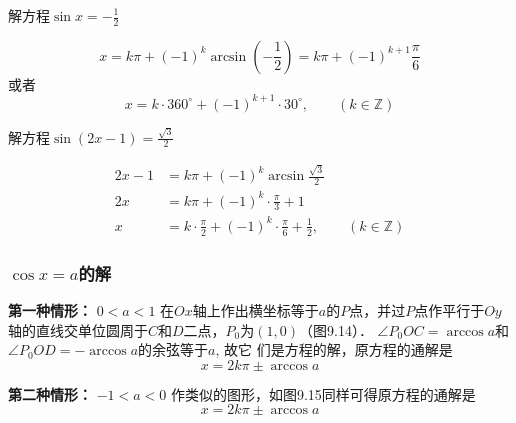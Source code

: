 \begin{example}
    解方程$\sin x=-\frac{1}{2} $
\end{example}

\begin{solution}
\[x=k\pi+(-1)^k\arcsin\left(-\frac{1}{2}\right)=k\pi+(-1)^{k+1}\frac{\pi}{6}\]
    或者\[x=k\cdot 360^{\circ}+(-1)^{k+1}\cdot  30^{\circ},\qquad (k\in\mathbb{Z})\]
\end{solution}


\begin{example}
    解方程$\sin (2x-1)=\frac{\sqrt{3}}{2} $
\end{example}

\begin{solution}
\[\begin{split}
   2x-1&=k\pi+(-1)^k \arcsin\frac{\sqrt{3}}{2}\\ 
2x&=k\pi+(-1)^k \cdot \frac{\pi}{3}+1\\
  x &=k\cdot\frac{\pi}{2}+(-1)^k\cdot \frac{\pi}{6}+\frac{1}{2} ,\qquad (k\in\mathbb{Z})
 \end{split}\]   
\end{solution}

\subsubsection{$\cos x=a$的解}

\textbf{第一种情形：} $0<a<1$
在$Ox$轴上作出横坐标等于$a$的$P$点，并过$P$点作平行于$Oy$
轴的直线交单位圆周于$C$和$D$二点，$P_0$为$(1,0)$（图9.14）．
$\angle P_0OC=\arccos a$和$\angle P_0OD=-\arccos a$的余弦等于$a$, 故它
们是方程的解，原方程的通解是
\[x=2k\pi\pm \arccos a\]

\textbf{第二种情形：} $-1<a<0$
作类似的图形，如图9.15同样可得原方程的通解是
\[x=2k\pi\pm \arccos a\]

